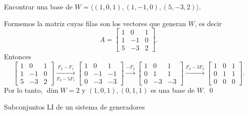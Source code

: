 \documentclass[handout]{beamer} %
\newcommand{\la}{\langle}
\newcommand{\ra}{\rangle}
\newcommand{\K}{\mathbb K}
\begin{document}
\begin{frame}
\begin{ejemplo*}\label{ej-4.5}
    Encontrar una base  de $W= \langle (1,0,1), (1,-1,0), (5,-3,2)\rangle$. 
\end{ejemplo*}\pause
\begin{solucion}\pause
    Formemos la matriz cuyas filas son los vectores que generan $W$,  es decir 
    $$
    A = \begin{bmatrix} 1&0&1 \\ 1&-1&0 \\ 5&-3&2 \end{bmatrix}.
    $$
    Entonces
    \begin{equation*}
    \begin{bmatrix}1&0&1 \\ 1&-1&0 \\ 5&-3&2  \end{bmatrix}
    \underset{F_3-5F_1}{\stackrel{F_2- F_1}{\longrightarrow}} 
    \begin{bmatrix}1&0&1 \\ 0&-1&-1 \\ 0&-3&-3\end{bmatrix}
    \stackrel{-F_2}{\longrightarrow} 
    \begin{bmatrix}1&0&1 \\ 0&1&1 \\ 0&-3&-3\end{bmatrix}
    \stackrel{F_3 - 3F_2}{\longrightarrow}
    \begin{bmatrix}1&0&1 \\ 0&1&1 \\ 0&0&0\end{bmatrix}.
    \end{equation*}
    Por lo tanto, $\dim W =2$ y $(1,0,1), (0,1,1)$ es una base de  $W$. \qed
\end{solucion}
\end{frame}


\begin{frame}{Subconjuntos LI de un sistema de generadores}
\pause
{}
\vskip 2cm
\end{frame}
\end{document}
